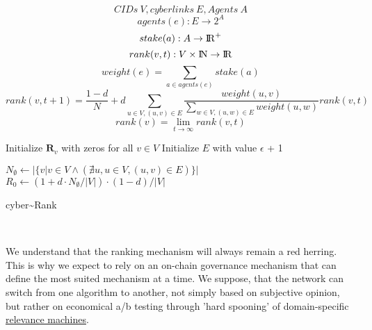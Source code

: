 \documentclass[8pt,oneside]{amsart}
\begin{document}
$$ CIDs \ V, cyberlinks \ E, Agents \ A $$
$$agents(e): E \rightarrow 2^{A}$$
$$stake(a): A \rightarrow {\rm I\!R}^+ $$
$$rank(v, t): V \times {\rm I\!N} \rightarrow {\rm I\!R} $$
$$weight(e) = \sum\limits_{a \in agents(e)}{stake(a)}$$
$$rank(v, t + 1) = \frac{1 - d}{N} + d\sum\limits_{u \in V, (u, v) \in E}{\frac{weight(u, v)}{\sum_{w \in V, (u, w) \in E}{weight(u, w)}}rank(v, t)} $$
$$rank(v) = \lim\limits_{t \rightarrow \infty} rank(v, t)$$
\begin{algorithm}


\BlankLine
Initialize $\textbf{R}_{v}$ with zeros for all $v \in V$\;
Initialize $E$ with value $\epsilon$ + 1\;

\BlankLine
$N_{\emptyset} \leftarrow |\{v|v \in V \land (\nexists u, u \in V, (u, v) \in E )\}|$ \;
$R_{0} \leftarrow (1 + d \cdot N_{\emptyset} / |V|) \cdot (1 - d) / |V| $ \;

\BlankLine
{}

\caption{cyber\~{}Rank}\label{algo_disjdecomp}
\end{algorithm}\

We understand that the ranking mechanism will always remain a red herring. This is why we expect to rely on an on-chain governance mechanism that can define the most suited mechanism at a time. We suppose, that the network can switch from one algorithm to another, not simply based on subjective opinion, but rather on economical a/b testing through 'hard spooning' of domain-specific {\hyperref[relevance-machine]{relevance machines}}.
\end{document}
